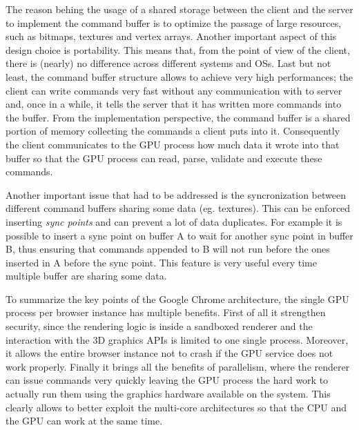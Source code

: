 The reason behing the usage of a shared storage between the client and the server to implement
the command buffer is to optimize the passage of large resources, such as bitmaps,
textures and vertex arrays. Another important aspect of this design choice is
portability. This means that, from the point of view of the client, there is (nearly) no
difference across different systems and OSs. Last but not least, the command buffer
structure allows to achieve very high performances; the client can write commands
very fast without any communication with to server and, once in a while,
it tells the server that it has written more commands into the buffer.
From the implementation perspective, the command buffer is a shared portion of
memory collecting the commands a client puts into it. Consequently the client
communicates to the GPU process how much data it wrote into that buffer so that
the GPU process can read, parse, validate and execute these commands.

Another important issue that had to be addressed is the syncronization between different
command buffers sharing some data (eg. textures). This can be enforced inserting
\emph{sync points} and can prevent a lot of data duplicates.
For example it is possible to insert a sync point on buffer A
to wait for another sync point in buffer B, thus ensuring that commands appended to
B will not run before the ones inserted in A before the sync point. This feature
is very useful every time multiple buffer are sharing some data.

To summarize the key points of the Google Chrome architecture, the single GPU
process per browser instance has multiple benefits. First of all it strengthen
security, since the rendering logic is inside a sandboxed renderer and the interaction
with the 3D graphics APIs is limited to one single process. Moreover, it allows
the entire browser instance not to crash if the GPU service does not work properly.
Finally it brings all the benefits of parallelism, where the renderer can issue
commands very quickly leaving the GPU process the hard work to actually run them
using the graphics hardware available on the system. This clearly allows to better
exploit the multi-core architectures so that the CPU and the GPU can work at the
same time.
